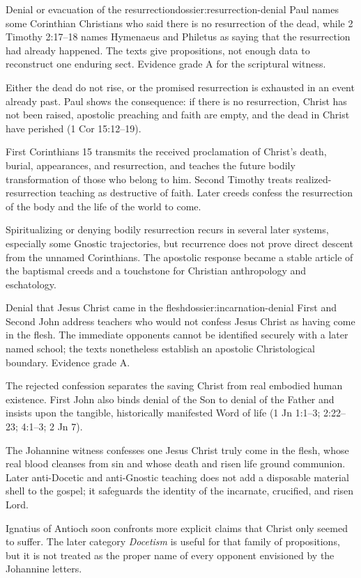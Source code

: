 \begin{heresydossier}{Denial or evacuation of the resurrection}{dossier:resurrection-denial}
\objectfield Paul names some Corinthian Christians who said there is no resurrection of the dead, while 2 Timothy 2:17--18 names Hymenaeus and Philetus as saying that the resurrection had already happened. The texts give propositions, not enough data to reconstruct one enduring sect. Evidence grade A for the scriptural witness.

\propositionfield Either the dead do not rise, or the promised resurrection is exhausted in an event already past. Paul shows the consequence: if there is no resurrection, Christ has not been raised, apostolic preaching and faith are empty, and the dead in Christ have perished (1 Cor 15:12--19).

\responsefield First Corinthians 15 transmits the received proclamation of Christ's death, burial, appearances, and resurrection, and teaches the future bodily transformation of those who belong to him. Second Timothy treats realized-resurrection teaching as destructive of faith. Later creeds confess the resurrection of the body and the life of the world to come.

\aftermathfield Spiritualizing or denying bodily resurrection recurs in several later systems, especially some Gnostic trajectories, but recurrence does not prove direct descent from the unnamed Corinthians. The apostolic response became a stable article of the baptismal creeds and a touchstone for Christian anthropology and eschatology.
\end{heresydossier}

\begin{heresydossier}{Denial that Jesus Christ came in the flesh}{dossier:incarnation-denial}
\objectfield First and Second John address teachers who would not confess Jesus Christ as having come in the flesh. The immediate opponents cannot be identified securely with a later named school; the texts nonetheless establish an apostolic Christological boundary. Evidence grade A.

\propositionfield The rejected confession separates the saving Christ from real embodied human existence. First John also binds denial of the Son to denial of the Father and insists upon the tangible, historically manifested Word of life (1 Jn 1:1--3; 2:22--23; 4:1--3; 2 Jn 7).

\responsefield The Johannine witness confesses one Jesus Christ truly come in the flesh, whose real blood cleanses from sin and whose death and risen life ground communion. Later anti-Docetic and anti-Gnostic teaching does not add a disposable material shell to the gospel; it safeguards the identity of the incarnate, crucified, and risen Lord.

\aftermathfield Ignatius of Antioch soon confronts more explicit claims that Christ only seemed to suffer. The later category \emph{Docetism} is useful for that family of propositions, but it is not treated as the proper name of every opponent envisioned by the Johannine letters.
\end{heresydossier}
